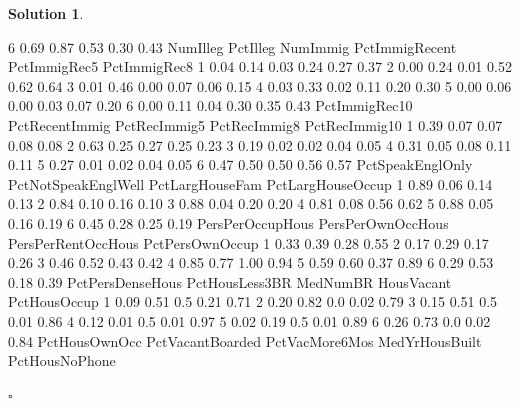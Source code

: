\documentclass[twoside]{article}
\theoremstyle{definition}
\newtheorem*{solutionT}{Solution}
\newenvironment{solution}{\begin{cBox}\begin{solutionT}}{\hfill{\scriptsize\ensuremath{\square}}\end{solutionT}\end{cBox}}
\theoremstyle{definition}
\begin{document}
\begin{enumerate}
\begin{solution}
\begin{Schunk}
\begin{Soutput}
6        0.69             0.87        0.53                0.30       0.43
  NumIlleg PctIlleg NumImmig PctImmigRecent PctImmigRec5 PctImmigRec8
1     0.04     0.14     0.03           0.24         0.27         0.37
2     0.00     0.24     0.01           0.52         0.62         0.64
3     0.01     0.46     0.00           0.07         0.06         0.15
4     0.03     0.33     0.02           0.11         0.20         0.30
5     0.00     0.06     0.00           0.03         0.07         0.20
6     0.00     0.11     0.04           0.30         0.35         0.43
  PctImmigRec10 PctRecentImmig PctRecImmig5 PctRecImmig8 PctRecImmig10
1          0.39           0.07         0.07         0.08          0.08
2          0.63           0.25         0.27         0.25          0.23
3          0.19           0.02         0.02         0.04          0.05
4          0.31           0.05         0.08         0.11          0.11
5          0.27           0.01         0.02         0.04          0.05
6          0.47           0.50         0.50         0.56          0.57
  PctSpeakEnglOnly PctNotSpeakEnglWell PctLargHouseFam PctLargHouseOccup
1             0.89                0.06            0.14              0.13
2             0.84                0.10            0.16              0.10
3             0.88                0.04            0.20              0.20
4             0.81                0.08            0.56              0.62
5             0.88                0.05            0.16              0.19
6             0.45                0.28            0.25              0.19
  PersPerOccupHous PersPerOwnOccHous PersPerRentOccHous PctPersOwnOccup
1             0.33              0.39               0.28            0.55
2             0.17              0.29               0.17            0.26
3             0.46              0.52               0.43            0.42
4             0.85              0.77               1.00            0.94
5             0.59              0.60               0.37            0.89
6             0.29              0.53               0.18            0.39
  PctPersDenseHous PctHousLess3BR MedNumBR HousVacant PctHousOccup
1             0.09           0.51      0.5       0.21         0.71
2             0.20           0.82      0.0       0.02         0.79
3             0.15           0.51      0.5       0.01         0.86
4             0.12           0.01      0.5       0.01         0.97
5             0.02           0.19      0.5       0.01         0.89
6             0.26           0.73      0.0       0.02         0.84
  PctHousOwnOcc PctVacantBoarded PctVacMore6Mos MedYrHousBuilt PctHousNoPhone

\end{Soutput}
\end{Schunk}
\end{solution}
\end{enumerate}
\end{document}

